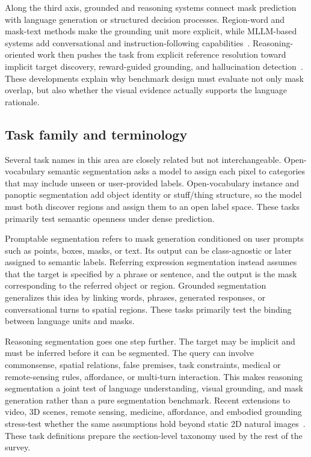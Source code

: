 Along the third axis, grounded and reasoning systems connect mask prediction with language generation or structured decision processes. Region-word and mask-text methods make the grounding unit more explicit, while MLLM-based systems add conversational and instruction-following capabilities~\citep{xuPixelalignedLanguageModel2024,zhangLlavagroundingGroundedVisual2024,youFerretReferGround2024,rasheed2024glamm}. Reasoning-oriented work then pushes the task from explicit reference resolution toward implicit target discovery, reward-guided grounding, and hallucination detection~\citep{lai2024lisa,renPixellmPixelReasoning2024,zhuLensLearningSegment2026,guoSeeingBelievingRichContext2026}. These developments explain why benchmark design must evaluate not only mask overlap, but also whether the visual evidence actually supports the language rationale.

\subsection{Task family and terminology}

Several task names in this area are closely related but not interchangeable. Open-vocabulary semantic segmentation asks a model to assign each pixel to categories that may include unseen or user-provided labels. Open-vocabulary instance and panoptic segmentation add object identity or stuff/thing structure, so the model must both discover regions and assign them to an open label space. These tasks primarily test semantic openness under dense prediction.

Promptable segmentation refers to mask generation conditioned on user prompts such as points, boxes, masks, or text. Its output can be class-agnostic or later assigned to semantic labels. Referring expression segmentation instead assumes that the target is specified by a phrase or sentence, and the output is the mask corresponding to the referred object or region. Grounded segmentation generalizes this idea by linking words, phrases, generated responses, or conversational turns to spatial regions. These tasks primarily test the binding between language units and masks.

Reasoning segmentation goes one step further. The target may be implicit and must be inferred before it can be segmented. The query can involve commonsense, spatial relations, false premises, task constraints, medical or remote-sensing rules, affordance, or multi-turn interaction. This makes reasoning segmentation a joint test of language understanding, visual grounding, and mask generation rather than a pure segmentation benchmark. Recent extensions to video, 3D scenes, remote sensing, medicine, affordance, and embodied grounding stress-test whether the same assumptions hold beyond static 2D natural images~\citep{xuVideosegr1ReasoningVideo2026,chen3DDRESDetailed3D2026,libExploringEfficientOpenvocabulary2026,yanMedreasonerReinforcementLearning2026,wangAffordancer1ReinforcementLearning2026}. These task definitions prepare the section-level taxonomy used by the rest of the survey.

